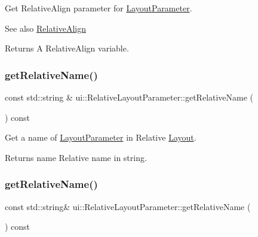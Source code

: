 Get Relative\+Align parameter for \hyperlink{classui_1_1LayoutParameter}{Layout\+Parameter}.

\begin{DoxySeeAlso}{See also}
\hyperlink{classui_1_1RelativeLayoutParameter_a40283d09524c58e61741de3288e6769d}{Relative\+Align} 
\end{DoxySeeAlso}
\begin{DoxyReturn}{Returns}
A Relative\+Align variable. 
\end{DoxyReturn}
\mbox{\label{classui_1_1RelativeLayoutParameter_a9b0f38b4f867f2acd88b85b37b76a0d4}} 
\subsubsection{\texorpdfstring{get\+Relative\+Name()}{getRelativeName()}\hspace{0.1cm}{\footnotesize\ttfamily [1/2]}}
{\footnotesize\ttfamily const std\+::string \& ui\+::\+Relative\+Layout\+Parameter\+::get\+Relative\+Name (\begin{DoxyParamCaption}{ }\end{DoxyParamCaption}) const}

Get a name of \hyperlink{classui_1_1LayoutParameter}{Layout\+Parameter} in Relative \hyperlink{classui_1_1Layout}{Layout}.

\begin{DoxyReturn}{Returns}
name Relative name in string. 
\end{DoxyReturn}
\mbox{\label{classui_1_1RelativeLayoutParameter_a4e83789fab96a1c78211e15887e41a6e}} 
\subsubsection{\texorpdfstring{get\+Relative\+Name()}{getRelativeName()}\hspace{0.1cm}{\footnotesize\ttfamily [2/2]}}
{\footnotesize\ttfamily const std\+::string\& ui\+::\+Relative\+Layout\+Parameter\+::get\+Relative\+Name (\begin{DoxyParamCaption}{ }\end{DoxyParamCaption}) const}

